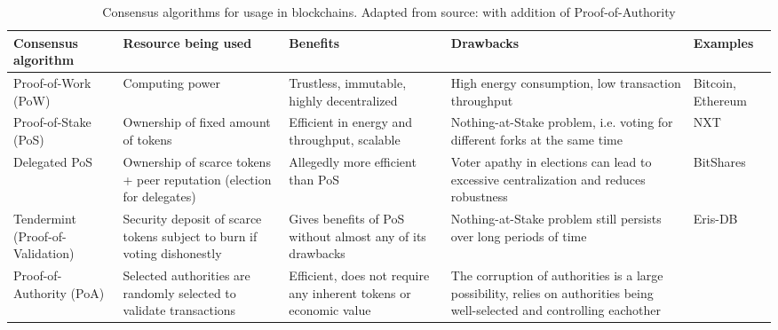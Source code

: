 \begin{table}[]
\centering
\def\arraystretch{1.5}
\begin{tabular}{@{}p{30mm}p{30mm}p{30mm}p{40mm}p{15mm}@{}}
\toprule
Consensus algorithm              & Resource being used                                                     & Benefits                                                          & Drawbacks                                                                                                                 & Examples          \\ \midrule
Proof-of-Work (PoW)              & Computing power                                                         & Trustless, immutable, highly decentralized                        & High energy consumption, low transaction throughput                                                                       & Bitcoin, Ethereum \\
Proof-of-Stake (PoS)             & Ownership of fixed amount of tokens                                     & Efficient in energy and throughput, scalable                      & Nothing-at-Stake problem, i.e. voting for different forks at the same time                                                & NXT               \\
Delegated PoS                    & Ownership of scarce tokens + peer reputation (election for delegates)   & Allegedly more efficient than PoS                                 & Voter apathy in elections can lead to excessive centralization and reduces robustness                                     & BitShares         \\
Tendermint (Proof-of-Validation) & Security deposit of scarce tokens subject to burn if voting dishonestly & Gives benefits of PoS without almost any of its drawbacks         & Nothing-at-Stake problem still persists over long periods of time                                                         & Eris-DB           \\
Proof-of-Authority (PoA)         & Selected authorities are randomly selected to validate transactions     & Efficient, does not require any inherent tokens or economic value & The corruption of authorities is a large possibility, relies on authorities being well-selected and controlling eachother &                   \\ \bottomrule
\end{tabular}
\caption{Consensus algorithms for usage in blockchains. Adapted from source:
\cite{consensus} with addition of Proof-of-Authority \label{table:consensus}}
\end{table}


